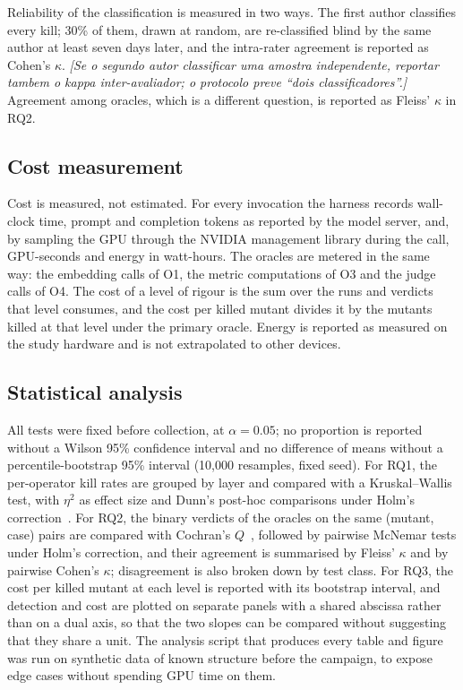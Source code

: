 \documentclass[a4paper,fleqn]{cas-dc}
\newcommand{\nota}[1]{{\color{blue}\itshape [#1]}}
\begin{document}
Reliability of the classification is measured in two ways. The first author
classifies every kill; 30\% of them, drawn at random, are re-classified blind
by the same author at least seven days later, and the intra-rater agreement is
reported as Cohen's $\kappa$. \nota{Se o segundo autor classificar uma amostra
independente, reportar tambem o kappa inter-avaliador; o protocolo preve
``dois classificadores''.} Agreement among oracles, which is a different
question, is reported as Fleiss' $\kappa$ in RQ2.

\subsection{Cost measurement}
\label{sec:cost}

Cost is measured, not estimated. For every invocation the harness records
wall-clock time, prompt and completion tokens as reported by the model server,
and, by sampling the GPU through the NVIDIA management library during the
call, GPU-seconds and energy in watt-hours. The oracles are metered in the
same way: the embedding calls of O1, the metric computations of O3 and the
judge calls of O4. The cost of a level of rigour is the sum over the runs and
verdicts that level consumes, and the cost per killed mutant divides it by the
mutants killed at that level under the primary oracle. Energy is reported as
measured on the study hardware and is not extrapolated to other devices.

\subsection{Statistical analysis}
\label{sec:stats}

All tests were fixed before collection, at $\alpha = 0.05$; no proportion is
reported without a Wilson 95\% confidence interval and no difference of means
without a percentile-bootstrap 95\% interval (10,000 resamples, fixed seed).
For RQ1, the per-operator kill rates are grouped by layer and compared with a
Kruskal--Wallis test, with $\eta^2$ as effect size and Dunn's post-hoc
comparisons under Holm's correction~\cite{holm1979simple}. For RQ2, the binary
verdicts of the oracles on the same (mutant, case) pairs are compared with
Cochran's $Q$~\cite{cochran1950comparison}, followed by pairwise McNemar tests
under Holm's correction, and their agreement is summarised by Fleiss' $\kappa$
and by pairwise Cohen's $\kappa$; disagreement is also broken down by test
class. For RQ3, the cost per killed mutant at each level is reported with its
bootstrap interval, and detection and cost are plotted on separate panels with
a shared abscissa rather than on a dual axis, so that the two slopes can be
compared without suggesting that they share a unit. The analysis script that
produces every table and figure was run on synthetic data of known structure
before the campaign, to expose edge cases without spending GPU time on them.
\end{document}
